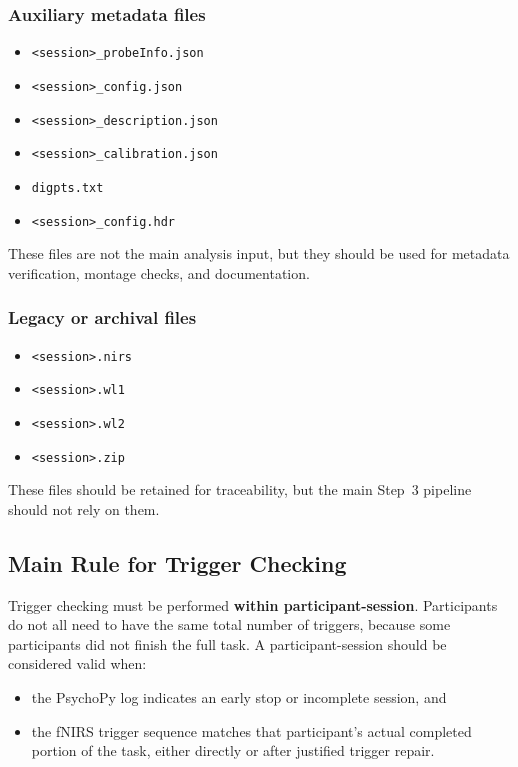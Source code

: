 \subsubsection*{Auxiliary metadata files}
\begin{itemize}
    \item \texttt{<session>\_probeInfo.json}
    \item \texttt{<session>\_config.json}
    \item \texttt{<session>\_description.json}
    \item \texttt{<session>\_calibration.json}
    \item \texttt{digpts.txt}
    \item \texttt{<session>\_config.hdr}
\end{itemize}

These files are not the main analysis input, but they should be used for metadata verification,
montage checks, and documentation.

\subsubsection*{Legacy or archival files}
\begin{itemize}
    \item \texttt{<session>.nirs}
    \item \texttt{<session>.wl1}
    \item \texttt{<session>.wl2}
    \item \texttt{<session>.zip}
\end{itemize}

These files should be retained for traceability, but the main Step~3 pipeline should not rely on them.

\subsection{Main Rule for Trigger Checking}
Trigger checking must be performed \textbf{within participant-session}.
Participants do not all need to have the same total number of triggers, because some participants
did not finish the full task.
A participant-session should be considered valid when:
\begin{itemize}
    \item the PsychoPy log indicates an early stop or incomplete session, and
    \item the fNIRS trigger sequence matches that participant's actual completed portion of the task,
    either directly or after justified trigger repair.
\end{itemize}

